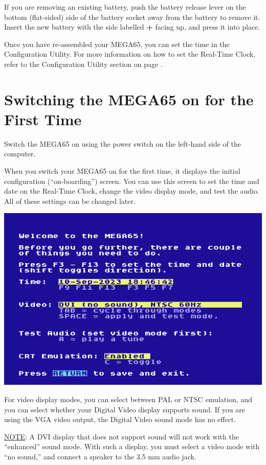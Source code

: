 If you are removing an existing battery, push the battery release lever on the bottom (flat-sided) side of the battery socket away from the battery to remove it. Insert the new battery with the side labelled {\bf +} facing up, and press it into place.

Once you have re-assembled your MEGA65, you can set the time in the Configuration Utility. For more information on how to set the Real-Time Clock, refer to the Configuration Utility section on page \pageref{sec:configuration-utility}.


\newpage

\section{Switching the MEGA65 on for the First Time}
\label{onboarding}

Switch the MEGA65 on using the power switch on the left-hand side of the computer.

When you switch your MEGA65 on for the first time, it displays the initial configuration (``on-boarding'') screen. You can use this screen to set the time and date on the Real-Time Clock, change the video display mode, and test the audio. All of these settings can be changed later.

\begin{center}
  \includegraphics[width=0.7\linewidth]{images/img011_final_boot_01.png}
\end{center}

For video display modes, you can select between PAL or NTSC emulation, and you can select whether your Digital Video display supports sound. If you are using the VGA video output, the Digital Video sound mode has no effect.

\underline{NOTE}: A DVI display that does not support sound will not work with the ``enhanced'' sound mode. With such a display, you must select a video mode with ``no sound,'' and connect a speaker to the 3.5 mm audio jack.

